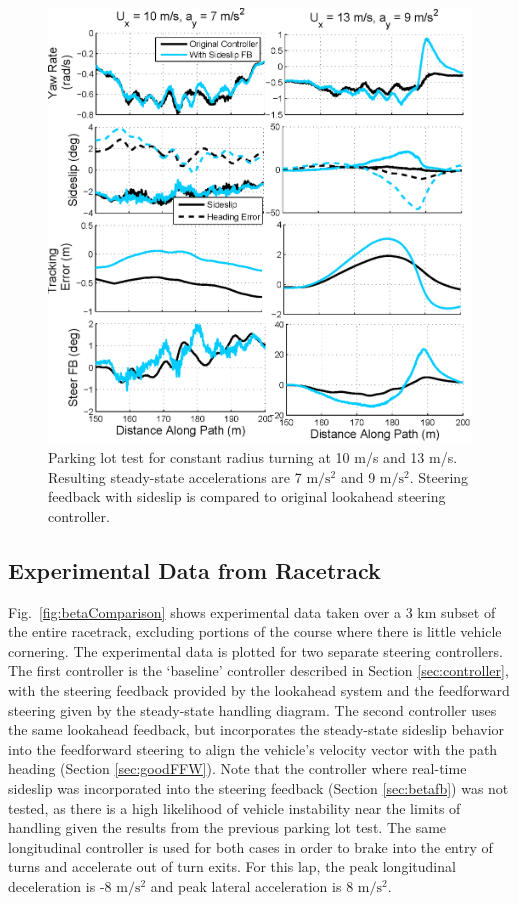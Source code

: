 \documentclass{nVSD2e}
\theoremstyle{plain}
\theoremstyle{definition}
\theoremstyle{remark}
\begin{document}
\begin{figure}[h]
\centering
\includegraphics[width=.9\columnwidth]{figures/wipeout.eps}
\caption{Parking lot test for constant radius turning at 10 m/s and 13 m/s. Resulting steady-state accelerations are 7 $\mathrm{m/s^2}$ and 9
$\mathrm{m/s^2}$. Steering feedback with sideslip is compared to original lookahead steering controller.}
\label{fig:wipeout}
\end{figure}




\subsection{Experimental Data from Racetrack}

Fig.~\ref{fig:betaComparison} shows experimental data taken over a 3 km subset of the entire racetrack,
excluding portions of the course where there is little vehicle cornering. The experimental data is plotted for two separate steering
controllers. The first controller is the `baseline' controller described in Section \ref{sec:controller}, with the
steering feedback provided by the lookahead system and the feedforward steering given by the steady-state handling diagram. The second controller uses the same lookahead feedback, but incorporates the steady-state sideslip
behavior into the feedforward steering to align the vehicle's velocity vector with the path heading (Section \ref{sec:goodFFW}).
Note that the controller where real-time sideslip was incorporated into the steering feedback (Section \ref{sec:betafb}) was not tested, as there is a high likelihood
of vehicle instability near the limits of handling given the results from the previous parking lot test. The same longitudinal controller is used for both cases in order to
 brake into the entry of turns and accelerate out of turn exits. For this lap, the peak longitudinal deceleration is -8 $\mathrm{m/s^2}$ and
 peak lateral acceleration is 8 $\mathrm{m/s^2}$.
 
\end{document}
